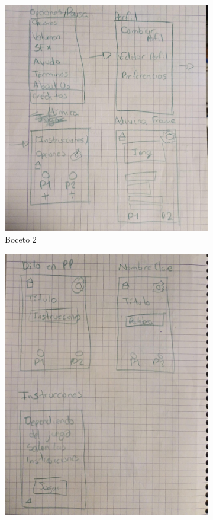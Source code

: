 \documentclass[12pt, oneside, letterpaper]{book}
\begin{document}
\begin{figure}[h]
\begin{subfigure}{.3\textwidth}
        \includegraphics[width=\linewidth]{BocetoInterfacesFN2.jpeg}
        \caption{Boceto 2 }
        \label{BP2FN}
    \end{subfigure}
		\begin{subfigure}{.3\textwidth}
        \includegraphics[width=\linewidth]{BocetoInterfacesFN3.jpeg}

\end{subfigure}
\end{figure}
\end{document}

